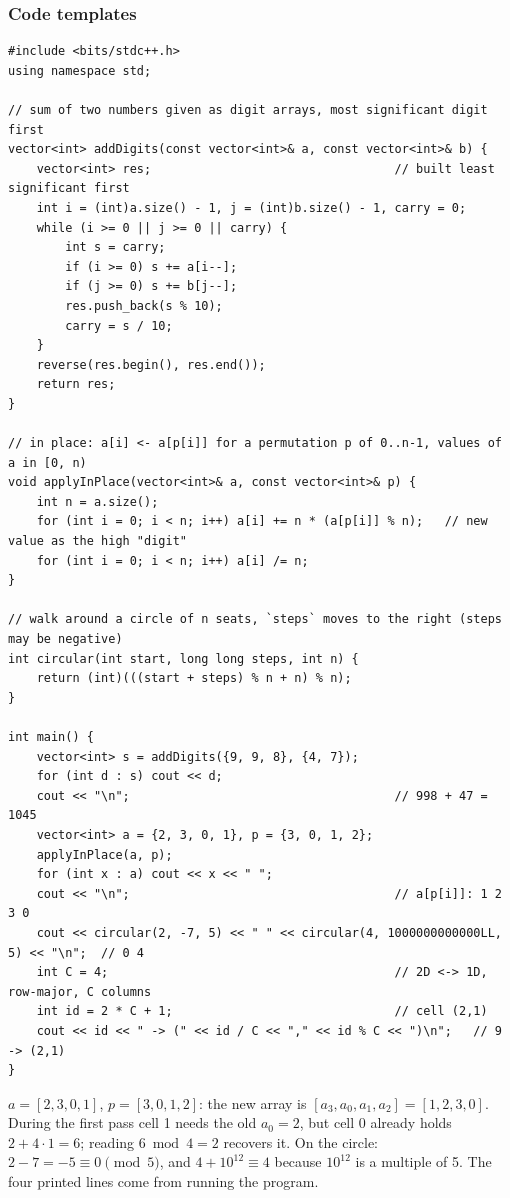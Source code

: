 \subsubsection*{Code templates}

\begin{lstlisting}[style=cpp]
#include <bits/stdc++.h>
using namespace std;

// sum of two numbers given as digit arrays, most significant digit first
vector<int> addDigits(const vector<int>& a, const vector<int>& b) {
    vector<int> res;                                  // built least significant first
    int i = (int)a.size() - 1, j = (int)b.size() - 1, carry = 0;
    while (i >= 0 || j >= 0 || carry) {
        int s = carry;
        if (i >= 0) s += a[i--];
        if (j >= 0) s += b[j--];
        res.push_back(s % 10);
        carry = s / 10;
    }
    reverse(res.begin(), res.end());
    return res;
}

// in place: a[i] <- a[p[i]] for a permutation p of 0..n-1, values of a in [0, n)
void applyInPlace(vector<int>& a, const vector<int>& p) {
    int n = a.size();
    for (int i = 0; i < n; i++) a[i] += n * (a[p[i]] % n);   // new value as the high "digit"
    for (int i = 0; i < n; i++) a[i] /= n;
}

// walk around a circle of n seats, `steps` moves to the right (steps may be negative)
int circular(int start, long long steps, int n) {
    return (int)(((start + steps) % n + n) % n);
}

int main() {
    vector<int> s = addDigits({9, 9, 8}, {4, 7});
    for (int d : s) cout << d;
    cout << "\n";                                     // 998 + 47 = 1045
    vector<int> a = {2, 3, 0, 1}, p = {3, 0, 1, 2};
    applyInPlace(a, p);
    for (int x : a) cout << x << " ";
    cout << "\n";                                     // a[p[i]]: 1 2 3 0
    cout << circular(2, -7, 5) << " " << circular(4, 1000000000000LL, 5) << "\n";  // 0 4
    int C = 4;                                        // 2D <-> 1D, row-major, C columns
    int id = 2 * C + 1;                               // cell (2,1)
    cout << id << " -> (" << id / C << "," << id % C << ")\n";   // 9 -> (2,1)
}
\end{lstlisting}

\begin{insightbox}
$a = [2,3,0,1]$, $p = [3,0,1,2]$: the new array is $[a_3, a_0, a_1, a_2] = [1,2,3,0]$. During the first pass cell 1 needs the old $a_0 = 2$, but cell 0 already holds $2 + 4 \cdot 1 = 6$; reading $6 \bmod 4 = 2$ recovers it. On the circle: $2 - 7 = -5 \equiv 0 \pmod 5$, and $4 + 10^{12} \equiv 4$ because $10^{12}$ is a multiple of 5. The four printed lines come from running the program.
\end{insightbox}

